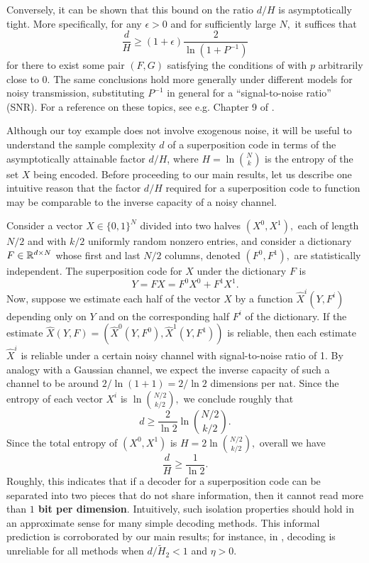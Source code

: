 Conversely, it can be shown that this bound on the ratio $d/H$ is asymptotically tight. More specifically, for any $\epsilon > 0$ and for sufficiently large $N,$ it suffices that
$$
\frac d {H} \ge (1 + \epsilon) \frac 2 {\ln (1 + P^{-1})}
$$
for there to exist some pair $(F, G)$ satisfying the conditions of  with $p$ arbitrarily close to 0. The same conclusions hold more generally under different models for noisy transmission, substituting $P^{-1}$ in general for a ``signal-to-noise ratio'' (SNR). For a reference on these topics, see e.g. Chapter 9 of \citet{cover_elements_2006}.

Although our toy example does not involve exogenous noise, it will be useful to understand the sample complexity $d$ of a superposition code in terms of the asymptotically attainable factor $d / H$, where $H = \ln \binom N k$ is the entropy of the set $X$ being encoded.  Before proceeding to our main results, let us describe one intuitive reason that the factor $d / H$ required for a superposition code to function may be comparable to the inverse capacity of a noisy channel.

Consider a vector $X \in \{0, 1\}^N$ divided into two halves $(X^0, X^1),$ each of length $N/2$ and with $k/2$ uniformly random nonzero entries, and consider a dictionary $F \in \mathbb{R}^{d \times N}$ whose first and last $N/2$ columns, denoted $(F^0, F^1),$ are statistically independent. The superposition code for $X$ under the dictionary $F$ is
$$
Y = F X = F^0 X^0 + F^1 X^1.
$$
Now, suppose we estimate each half of the vector $X$ by a function $\hat X^i(Y, F^i)$ depending only on $Y$ and on the corresponding half $F^i$ of the dictionary. If the estimate $\hat X(Y, F) = (\hat X^0(Y, F^0), \hat X^1(Y, F^1))$ is reliable, then each estimate $\hat X^i$ is reliable under a certain noisy channel with signal-to-noise ratio of 1. By analogy with a Gaussian channel, we expect the inverse capacity of such a channel to be around $2 / \ln(1 + 1) = 2 / \ln 2$ dimensions per nat. Since the entropy of each vector $X^i$ is $\ln \binom {N/2}{k/2},$ we conclude roughly that
$$
d \ge \frac{2}{\ln 2} \ln \binom{N/2}{k/2}.
$$
Since the total entropy of $(X^0, X^1)$ is $H = 2 \ln \binom{N/2}{k/2},$ overall we have
$$
\frac d H \ge \frac{1}{\ln 2}.
$$
Roughly, this indicates that if a decoder for a superposition code can be separated into two pieces that do not share information, then it cannot read more than \textbf{$1$ bit per dimension}. Intuitively, such isolation properties should hold in an approximate sense for many simple decoding methods. This informal prediction is corroborated by our main results; for instance, in , decoding is unreliable for all methods when $d/\tilde H_2 < 1$ and $\eta > 0.$
